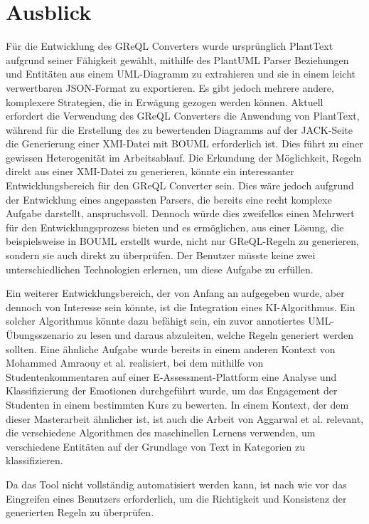 \section{Ausblick}

Für die Entwicklung des GReQL Converters wurde ursprünglich PlantText aufgrund seiner Fähigkeit gewählt, mithilfe des
PlantUML Parser Beziehungen und Entitäten aus einem UML-Diagramm zu extrahieren und sie in einem leicht verwertbaren
JSON-Format zu exportieren. Es gibt jedoch mehrere andere, komplexere Strategien, die in Erwägung gezogen werden können.
Aktuell erfordert die Verwendung des GReQL Converters die Anwendung von PlantText, während für die Erstellung des zu
bewertenden Diagramms auf der JACK-Seite die Generierung einer XMI-Datei mit BOUML erforderlich ist. Dies führt zu einer
gewissen Heterogenität im Arbeitsablauf. Die Erkundung der Möglichkeit, Regeln direkt aus einer XMI-Datei zu generieren,
könnte ein interessanter Entwicklungsbereich für den GReQL Converter sein. Dies wäre jedoch aufgrund der Entwicklung
eines angepassten Parsers, die bereits eine recht komplexe Aufgabe darstellt, anspruchsvoll. Dennoch würde dies
zweifellos einen Mehrwert für den Entwicklungsprozess bieten und es ermöglichen, aus einer Lösung, die beispielsweise
in BOUML erstellt wurde, nicht nur GReQL-Regeln zu generieren, sondern sie auch direkt zu überprüfen. Der Benutzer
müsste keine zwei unterschiedlichen Technologien erlernen, um diese Aufgabe zu erfüllen.

Ein weiterer Entwicklungsbereich, der von Anfang an aufgegeben wurde, aber dennoch von Interesse sein könnte, ist die
Integration eines KI-Algorithmus. Ein solcher Algorithmus könnte dazu befähigt sein, ein zuvor annotiertes
UML-Übungsszenario zu lesen und daraus abzuleiten, welche Regeln generiert werden sollten. Eine ähnliche Aufgabe wurde
bereits in einem anderen Kontext von Mohammed Amraouy et al.\cite{amraouy2023sentiment} realisiert, bei dem mithilfe
von Studentenkommentaren auf einer E-Assessment-Plattform eine Analyse und Klassifizierung der Emotionen durchgeführt
wurde, um das Engagement der Studenten in einem bestimmten Kurs zu bewerten. In einem Kontext, der dem dieser
Masterarbeit ähnlicher ist, ist auch die Arbeit von Aggarwal et al.\cite{aggarwal2018machine} relevant, die verschiedene
Algorithmen des maschinellen Lernens verwenden, um verschiedene Entitäten auf der Grundlage von Text in Kategorien zu
klassifizieren.

Da das Tool nicht vollständig automatisiert werden kann, ist nach wie vor das Eingreifen eines Benutzers erforderlich,
um die Richtigkeit und Konsistenz der generierten Regeln zu überprüfen.